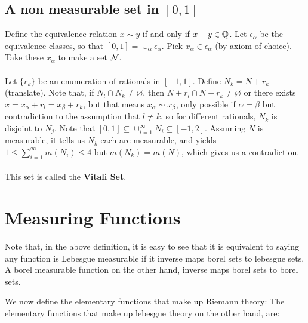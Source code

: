 \documentclass[main.tex]{subfiles}
\begin{document}
\subsection{A non measurable set in $[0,1]$}
Define the equivalence relation $x \sim y$ if and only if $x-y \in \mathbb Q$. Let $\epsilon_{\alpha}$ be the equivalence classes, so that $[0,1]=\cup_{\alpha} \epsilon_{\alpha}$. Pick $x_{\alpha}\in \epsilon_{\alpha}$ (by axiom of choice). Take these $x_{\alpha}$ to make a set $\mathcal N$.
\\\\ Let $\{r_k\}$ be an enumeration of rationals in $[-1,1]$. Define $N_k=N+r_k$ (translate). Note that, if $N_l\cap N_k\neq \varnothing$, then $N+r_l\cap N+r_k \neq \varnothing$ or there exists $x=x_{\alpha}+r_l=x_{\beta}+r_k$, but that means $x_{\alpha}\sim x_{\beta}$, only possible if $\alpha=\beta$ but contradiction to the assumption that $l \neq k$, so for different rationals, $N_k$ is disjoint to $N_j$. Note that $[0,1]\subseteq \cup_{i=1}^{\infty}N_i \subseteq [-1,2]$. Assuming $N$ is measurable, it tells us $N_k $ each are measurable, and yields $1 \leq \sum_{i=1}^{\infty} m(N_i)\leq 4$ but $m(N_k)=m(N)$, which gives us a contradiction. 
\\\\ This set is called the \textbf{Vitali Set}. 

\section{Measuring Functions}
\defn{Measurable Function}{A function $f:\RR^d \to \RR\cup \{-\infty,\infty\}$ is said to be \emph{measurable} if $f^{-1}([-\infty,a))$ is measurable in $\RR^d$.}
\begin{remark}
    Note that, in the above definition, it is easy to see that it is equivalent to saying any function is Lebesgue measurable if it inverse maps borel sets to lebesgue sets. 
    \\ A borel measurable function on the other hand, inverse maps borel sets to borel sets.
\end{remark} 
We now define the elementary functions that make up Riemann theory:
The elementary functions that make up lebesgue theory on the other hand, are:
\end{document}
